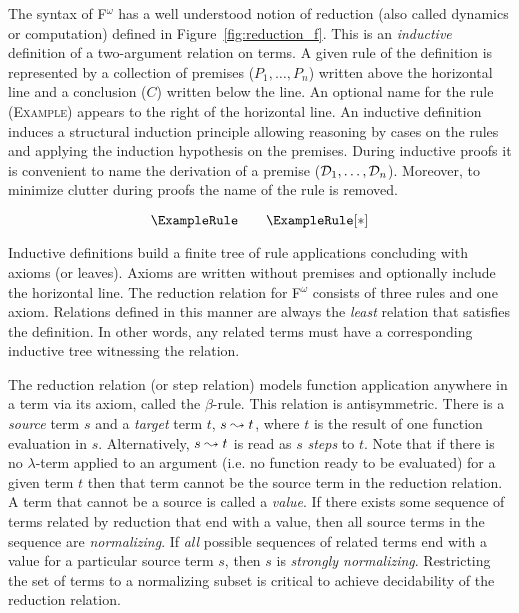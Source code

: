 

The syntax of F$^\omega$ has a well understood notion of reduction (also called dynamics or computation) defined in Figure~\ref{fig:reduction_f}.
This is an \textit{inductive} definition of a two-argument relation on terms.
A given rule of the definition is represented by a collection of premises ($P_1, \ldots, P_n$) written above the horizontal line and a conclusion ($C$) written below the line.
An optional name for the rule (\textsc{Example}) appears to the right of the horizontal line.
An inductive definition induces a structural induction principle allowing reasoning by cases on the rules and applying the induction hypothesis on the premises.
During inductive proofs it is convenient to name the derivation of a premise ($\mathcal{D}_{1}, \ldots, \mathcal{D}_{n}$).
Moreover, to minimize clutter during proofs the name of the rule is removed.

$$\ExampleRule \quad\quad \ExampleRule[*]$$

Inductive definitions build a finite tree of rule applications concluding with axioms (or leaves).
Axioms are written without premises and optionally include the horizontal line.
The reduction relation for F$^\omega$ consists of three rules and one axiom.
Relations defined in this manner are always the \textit{least} relation that satisfies the definition.
In other words, any related terms must have a corresponding inductive tree witnessing the relation.

The reduction relation (or step relation) models function application anywhere in a term via its axiom, called the $\beta$-rule.
This relation is antisymmetric.
There is a \textit{source} term $s$ and a \textit{target} term $t$, $s \leadsto t$, where $t$ is the result of one function evaluation in $s$.
Alternatively, $s \leadsto t$ is read as $s$ \textit{steps} to $t$.
Note that if there is no $\lambda$-term applied to an argument (i.e. no function ready to be evaluated) for a given term $t$ then that term cannot be the source term in the reduction relation.
A term that cannot be a source is called a \textit{value}.
If there exists some sequence of terms related by reduction that end with a value, then all source terms in the sequence are \textit{normalizing}.
If \textit{all} possible sequences of related terms end with a value for a particular source term $s$, then $s$ is \textit{strongly normalizing}.
Restricting the set of terms to a normalizing subset is critical to achieve decidability of the reduction relation.

